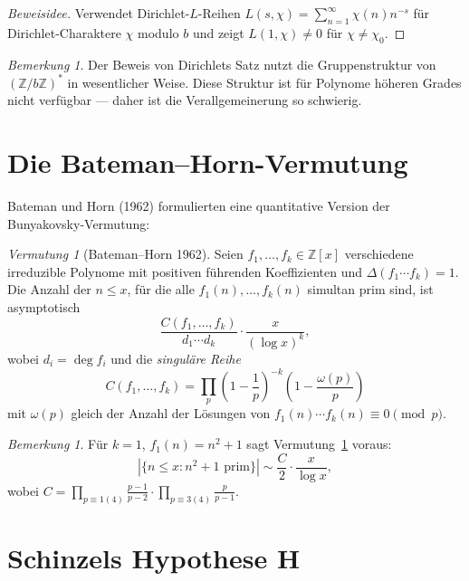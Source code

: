 \documentclass[12pt,a4paper]{amsart}
\theoremstyle{definition}
\theoremstyle{remark}
\newtheorem{bemerkung}[theorem]{Bemerkung}
\newtheorem{vermutung}[theorem]{Vermutung}
\newcommand{\Z}{\mathbb{Z}}
\begin{document}
\begin{proof}[Beweisidee]
Verwendet Dirichlet-$L$-Reihen $L(s, \chi) = \sum_{n=1}^\infty \chi(n) n^{-s}$
für Dirichlet-Charaktere $\chi$ modulo $b$ und zeigt $L(1, \chi) \neq 0$
für $\chi \neq \chi_0$.
\end{proof}

\begin{bemerkung}
Der Beweis von Dirichlets Satz nutzt die Gruppenstruktur von $(\Z/b\Z)^*$
in wesentlicher Weise.
Diese Struktur ist für Polynome höheren Grades nicht verfügbar --- daher
ist die Verallgemeinerung so schwierig.
\end{bemerkung}

\section{Die Bateman--Horn-Vermutung}

Bateman und Horn (1962) formulierten eine quantitative Version der
Bunyakovsky-Vermutung:

\begin{vermutung}[Bateman--Horn 1962]
\label{verm:BH}
Seien $f_1, \ldots, f_k \in \Z[x]$ verschiedene irreduzible Polynome mit
positiven führenden Koeffizienten und $\Delta(f_1 \cdots f_k) = 1$.
Die Anzahl der $n \leq x$, für die alle $f_1(n), \ldots, f_k(n)$ simultan
prim sind, ist asymptotisch
\[
  \frac{C(f_1, \ldots, f_k)}{d_1 \cdots d_k} \cdot \frac{x}{(\log x)^k},
\]
wobei $d_i = \deg f_i$ und die \emph{singuläre Reihe}
\[
  C(f_1, \ldots, f_k)
  = \prod_p \left(1 - \frac{1}{p}\right)^{-k}
    \left(1 - \frac{\omega(p)}{p}\right)
\]
mit $\omega(p)$ gleich der Anzahl der Lösungen von
$f_1(n) \cdots f_k(n) \equiv 0 \pmod{p}$.
\end{vermutung}

\begin{bemerkung}
Für $k=1$, $f_1(n) = n^2 + 1$ sagt Vermutung~\ref{verm:BH} voraus:
\[
  |\{n \leq x : n^2 + 1 \text{ prim}\}| \sim \frac{C}{2} \cdot \frac{x}{\log x},
\]
wobei $C = \prod_{p \equiv 1 (4)} \frac{p-1}{p-2} \cdot \prod_{p \equiv 3 (4)} \frac{p}{p-1}$.
\end{bemerkung}

\section{Schinzels Hypothese H}
\end{document}
